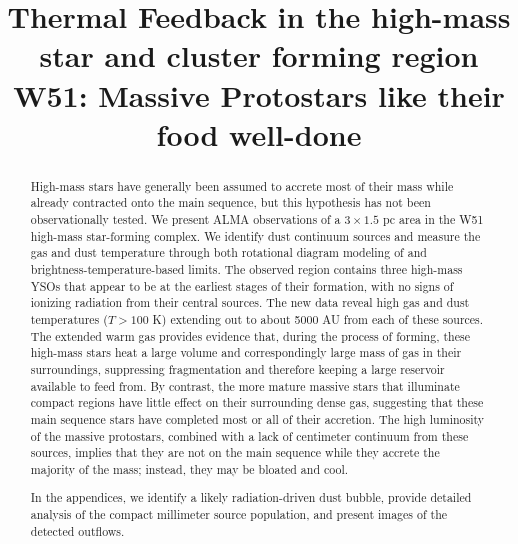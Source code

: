 \documentclass{emulateapj}
\begin{document}
\title{Thermal Feedback in the high-mass star and cluster forming region W51:
       Massive Protostars like their food well-done}




\begin{abstract}
    High-mass stars have generally been assumed to accrete most of their
    mass while already contracted onto the main sequence, but this
    hypothesis has not been observationally tested.
    We present ALMA observations of a $3\times1.5$ pc area in the W51
    high-mass star-forming complex.  We identify dust continuum sources and
    measure the gas and dust temperature through both rotational diagram
    modeling of \methanol and brightness-temperature-based limits.  The
    observed region contains three high-mass YSOs that appear to be at the
    earliest stages of their formation, with no signs of ionizing radiation
    from their central sources.  The new data reveal  high gas and dust
    temperatures ($T > 100$ K) extending out to about 5000 AU from each of
    these sources.
    The extended warm gas provides evidence that, during the process of
    forming, these high-mass stars heat a large volume and correspondingly
    large mass of gas in their surroundings, suppressing fragmentation and
    therefore keeping a large reservoir available to feed from.  By contrast,
    the more mature massive stars that illuminate compact \hii regions have
    little effect on their surrounding dense gas, suggesting that these main
    sequence stars have completed most or all of their accretion.  
    The high luminosity of the massive protostars, combined with a lack of
    centimeter continuum from these sources, implies that they are not on
    the main sequence while they accrete the majority of the mass; instead,
    they may be bloated and cool.

    In the appendices, we identify a likely radiation-driven dust bubble,
    provide detailed analysis of the compact millimeter source population, and
    present images of the detected outflows.
    

\end{abstract}
\end{document}
